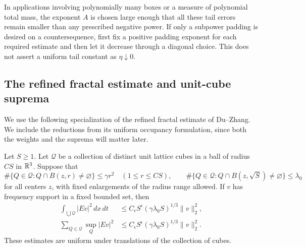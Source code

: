 In applications involving polynomially many boxes or a measure of polynomial
total mass, the exponent $A$ is chosen large enough that all these tail errors
remain smaller than any prescribed negative power.  If only a subpower
padding is desired on a countersequence, first fix a positive padding exponent
for each required estimate and then let it decrease through a diagonal choice.
This does not assert a uniform tail constant as $\eta\downarrow0$.

\subsection{The refined fractal estimate and unit-cube suprema}

We use the following specialization of the refined fractal estimate of
Du--Zhang.  We include the reductions from its uniform occupancy formulation,
since both the weights and the suprema will matter later.

\begin{lemma}
\label{lem:fractal}
Let $S\geq1$.  Let $\mathcal Q$ be a collection of distinct unit lattice
cubes in a ball of radius $CS$ in $\mathbb R^3$.  Suppose that
\begin{equation}
 \#\{Q\in\mathcal Q:Q\cap B(z,r)\ne\varnothing\}
 \leq\gamma r^2\quad(1\leq r\leq CS),
 \qquad
 \#\{Q\in\mathcal Q:Q\cap B(z,\sqrt S)\ne\varnothing\}
 \leq\lambda_0
 \label{eq:prelim-fractal-counts}
\end{equation}
for all centers $z$, with fixed enlargements of the radius range allowed.
If $v$ has frequency support in a fixed bounded set, then
\begin{align}
 \int_{\bigcup\mathcal Q}|Ev|^2\,dx\,dt
 &\leq C_\epsilon S^\epsilon
       (\gamma\lambda_0S)^{1/3}\|v\|_2^2,
 \label{eq:prelim-fractal-integral}\\
 \sum_{Q\in\mathcal Q}\sup_Q|Ev|^2
 &\leq C_\epsilon S^\epsilon
       (\gamma\lambda_0S)^{1/3}\|v\|_2^2.
 \label{eq:prelim-fractal-sup}
\end{align}
These estimates are uniform under translations of the collection of cubes.
\end{lemma}

